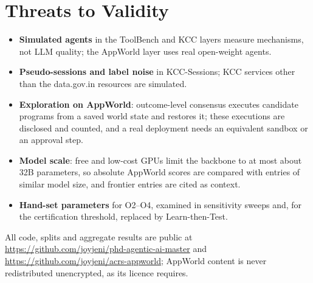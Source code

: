 \section{Threats to Validity}
\label{sec:method-threats}

\begin{itemize}[leftmargin=*]
\item \textbf{Simulated agents} in the ToolBench and KCC layers measure mechanisms, not LLM quality; the
AppWorld layer uses real open-weight agents.
\item \textbf{Pseudo-sessions and label noise} in KCC-Sessions; KCC services other than the
data.gov.in resources are simulated.
\item \textbf{Exploration on AppWorld}: outcome-level consensus executes candidate programs from a saved
world state and restores it; these executions are disclosed and counted, and a real deployment needs an
equivalent sandbox or an approval step.
\item \textbf{Model scale}: free and low-cost GPUs limit the backbone to at most about 32B parameters,
so absolute AppWorld scores are compared with entries of similar model size, and frontier entries are
cited as context.
\item \textbf{Hand-set parameters} for O2--O4, examined in sensitivity sweeps and, for the certification
threshold, replaced by Learn-then-Test.
\end{itemize}

All code, splits and aggregate results are public at \url{https://github.com/joyjeni/phd-agentic-ai-master}
and \url{https://github.com/joyjeni/acrs-appworld}; AppWorld content is never redistributed unencrypted,
as its licence requires.

